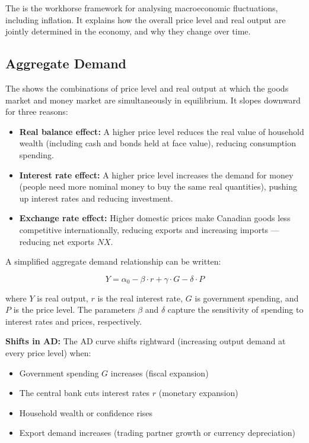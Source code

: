 The  is the
workhorse framework for analysing macroeconomic fluctuations, including
inflation. It explains how the overall price level and real output are
jointly determined in the economy, and why they change over time.

\subsection{Aggregate Demand}

The  shows the combinations of price
level and real output at which the goods market and money market are
simultaneously in equilibrium. It slopes downward for three reasons:

\begin{itemize}
  \item \textbf{Real balance effect:} A higher price level reduces the
        real value of household wealth (including cash and bonds held at
        face value), reducing consumption spending.
  \item \textbf{Interest rate effect:} A higher price level increases
        the demand for money (people need more nominal money to buy the
        same real quantities), pushing up interest rates and reducing
        investment.
  \item \textbf{Exchange rate effect:} Higher domestic prices make
        Canadian goods less competitive internationally, reducing exports
        and increasing imports --- reducing net exports $NX$.
\end{itemize}

A simplified aggregate demand relationship can be written:

\begin{equation}
  Y = \alpha_0 - \beta \cdot r + \gamma \cdot G - \delta \cdot P
  \label{eq:ad_simplified}
\end{equation}

\noindent where $Y$ is real output, $r$ is the real interest rate,
$G$ is government spending, and $P$ is the price level. The parameters
$\beta$ and $\delta$ capture the sensitivity of spending to interest
rates and prices, respectively.

\textbf{Shifts in AD:} The AD curve shifts rightward (increasing output
demand at every price level) when:
\begin{itemize}
  \item Government spending $G$ increases (fiscal expansion)
  \item The central bank cuts interest rates $r$ (monetary expansion)
  \item Household wealth or confidence rises
  \item Export demand increases (trading partner growth or currency depreciation)
\end{itemize}

